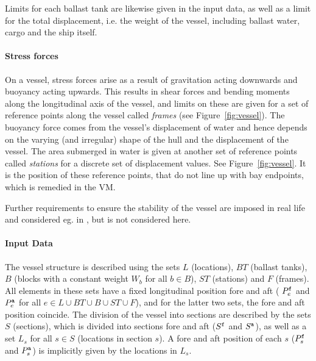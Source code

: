 Limits for each ballast tank are likewise given in the input data, as well as a limit for the total displacement, i.e. the weight of the vessel, including ballast water, cargo and the ship itself. 
%

\paragraph{Stress forces}
On a vessel, stress forces arise as a result of gravitation acting downwards and buoyancy acting upwards. This results in shear forces and bending moments along the longitudinal axis of the vessel, and limits on these are given for a set of reference points along the vessel called \emph{frames} (see Figure~\ref{fig:vessel}). 
%
The buoyancy force comes from the vessel's displacement of water and hence depends on the varying (and irregular) shape of the hull and the displacement of the vessel. The area submerged in water is given at another set of reference points called \emph{stations} for a discrete set of displacement values. See Figure~\ref{fig:vessel}.
It is the position of these reference points, that do not line up with bay endpoints, which is remedied in the VM.

Further requirements to ensure the stability of the vessel are imposed in real life and considered eg. in \cite{AlbertosThesis}, but is not considered here.

\paragraph{Input Data}
The vessel structure is described using the sets $L$ (locations), $BT$ (ballast tanks), $B$ (blocks with a constant weight $W_b$ for all $b\in B$), $ST$ (stations) and $F$ (frames). All elements in these sets have a fixed longitudinal position fore and aft ( $P^{\texttt{f}}_e$ and $P^{\texttt{a}}_e$ for all $e\in L\cup BT \cup B \cup ST \cup F$), and for the latter two sets, the fore and aft position coincide. %
%
The division of the vessel into sections are described by the sets $S$ (sections), which is divided into sections fore and aft ($S^{\texttt{f}}$ and $S^{\texttt{a}}$), as well as a set $L_s$ for all $s\in S$ (locations in section $s$). A fore and aft position of each $s$ ($P^{\texttt{f}}_s$ and $P^{\texttt{a}}_s$) is implicitly given by the locations in $L_s$.%

